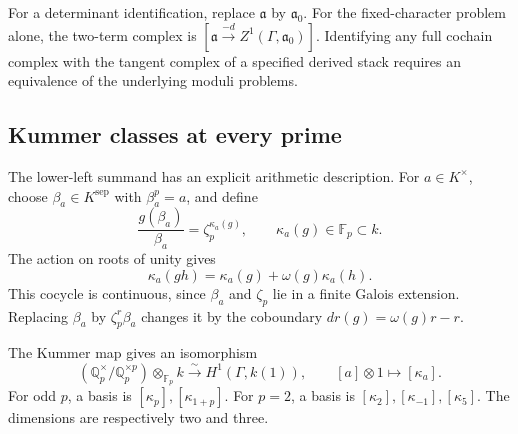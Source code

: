 For a determinant identification, replace \(\mathfrak a\) by \(\mathfrak a_0\).
For the fixed-character problem alone, the two-term complex is
\([\mathfrak a\xrightarrow{-d}Z^1(\Gamma,\mathfrak a_0)]\).
Identifying any full cochain complex with the tangent complex of a
specified derived stack requires an equivalence of the underlying
moduli problems.

\subsection{Kummer classes at every prime}

The lower-left summand has an explicit arithmetic description.
For \(a\in K^\times\), choose \(\beta_a\in K^{\mathrm{sep}}\) with
\(\beta_a^p=a\), and define
\[
 \frac{g(\beta_a)}{\beta_a}=\zeta_p^{\kappa_a(g)},
 \qquad \kappa_a(g)\in\mathbb F_p\subset k.
\]
The action on roots of unity gives
\[
 \kappa_a(gh)=\kappa_a(g)+\omega(g)\kappa_a(h).
\]
This cocycle is continuous, since \(\beta_a\) and \(\zeta_p\) lie in a
finite Galois extension. Replacing \(\beta_a\) by \(\zeta_p^r\beta_a\)
changes it by the coboundary \(dr(g)=\omega(g)r-r\).

\begin{proposition}
\label{v4-arith:ic:local-cyclotomic:kummer}
The Kummer map gives an isomorphism
\[
 (\mathbb Q_p^\times/\mathbb Q_p^{\times p})\otimes_{\mathbb F_p}k
 \xrightarrow{\sim} H^1(\Gamma,k(1)),\qquad [a]\otimes1\longmapsto[\kappa_a].
\]
For odd \(p\), a basis is \([\kappa_p],[\kappa_{1+p}]\).
For \(p=2\), a basis is \([\kappa_2],[\kappa_{-1}],[\kappa_5]\).
The dimensions are respectively two and three.
\end{proposition}

